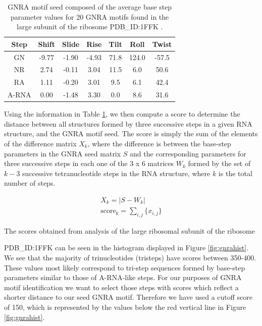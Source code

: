 \begin{table}[hb]  
\begin{center}
\begin{tabular}{|c|c|c|c|c|c|c|}
\hline
Step & Shift & Slide & Rise & Tilt & Roll & Twist \\
\hline
GN & -9.77 & -1.90 & -4.93 & 71.8 & 124.0 & -57.5 \\
NR & 2.74 & -0.11 & 3.04 & 11.5 & 6.0 & 50.6 \\
RA & 1.11 & -0.20 & 3.01 & 9.5 & 6.1 & 42.4 \\ \hline
A-RNA & 0.00 & -1.48 & 3.30 & 0.0 & 8.6 & 31.6\\
\hline
\end{tabular}
\caption{GNRA motif  seed composed of the average  base step parameter
  values for 20 GNRA motifs found in the large subunit of the ribosome
  PDB\_ID:1FFK \cite{lemieux2006}.}
\label{tab:seed}
\end{center}
\end{table}

Using the information in Table \ref{tab:seed}, we then compute a score
to  determine the  distance  between all  structures  formed by  three
successive  steps  in  a  given  RNA structure,  and  the  GNRA  motif
seed. The  score is simply the  sum of the elements  of the difference
matrix  $X_{k}$,  where  the   difference  is  between  the  base-step
parameters  in  the  GNRA   seed  matrix  $S$  and  the  corresponding
parameters  for three  successive  steps in  each  one of  the  3 x  6
matrices $W_{k}$ formed by the set of $k-3$ successive tetranucleotide
steps in the RNA structure, where  $k$ is the total number of steps.

\begin{gather}
X_{k} = |S - W_{k}| \\
\text{score}_{k} = \sum_{i,j} \{x_{i,j}\} 
\label{eq:sumdiffscore}
\end{gather}  

The scores  obtained from analysis  of the large ribosomal  subunit of
the ribosome

\noindent PDB\_ID:1FFK can be seen in the histogram displayed in
Figure \ref{fig:gnrahist}. We see  that the majority of trinucleotides
(tristeps)  have scores  between  350-400.  These  values most  likely
correspond  to  tri-step  sequences  formed  by  base-step  parameters
similar to those of A-RNA-like  steps.  For our purposes of GNRA motif
identification we want to select those steps with scores which reflect
a shorter distance  to our seed GNRA motif.  Therefore  we have used a
cutoff score of 150, which is  represented by the values below the red
vertical line in Figure \ref{fig:gnrahist}.

